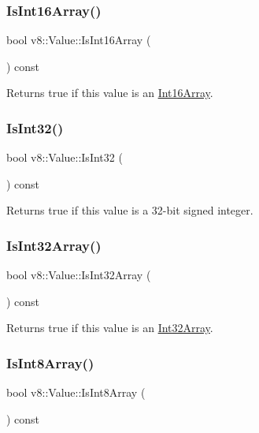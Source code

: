 \subsubsection{\texorpdfstring{Is\+Int16\+Array()}{IsInt16Array()}}
{\footnotesize\ttfamily bool v8\+::\+Value\+::\+Is\+Int16\+Array (\begin{DoxyParamCaption}{ }\end{DoxyParamCaption}) const}

Returns true if this value is an \mbox{\hyperlink{classv8_1_1Int16Array}{Int16\+Array}}. \mbox{\label{classv8_1_1Value_ad5d58df1d978b4d9875eb97b3bebfc29}} 
\subsubsection{\texorpdfstring{Is\+Int32()}{IsInt32()}}
{\footnotesize\ttfamily bool v8\+::\+Value\+::\+Is\+Int32 (\begin{DoxyParamCaption}{ }\end{DoxyParamCaption}) const}

Returns true if this value is a 32-\/bit signed integer. \mbox{\label{classv8_1_1Value_afd14729579f9768a7d3f8bc3db6c1d28}} 
\subsubsection{\texorpdfstring{Is\+Int32\+Array()}{IsInt32Array()}}
{\footnotesize\ttfamily bool v8\+::\+Value\+::\+Is\+Int32\+Array (\begin{DoxyParamCaption}{ }\end{DoxyParamCaption}) const}

Returns true if this value is an \mbox{\hyperlink{classv8_1_1Int32Array}{Int32\+Array}}. \mbox{\label{classv8_1_1Value_ad9c2858387a0cafe3628f0533a9bbf6a}} 
\subsubsection{\texorpdfstring{Is\+Int8\+Array()}{IsInt8Array()}}
{\footnotesize\ttfamily bool v8\+::\+Value\+::\+Is\+Int8\+Array (\begin{DoxyParamCaption}{ }\end{DoxyParamCaption}) const}

